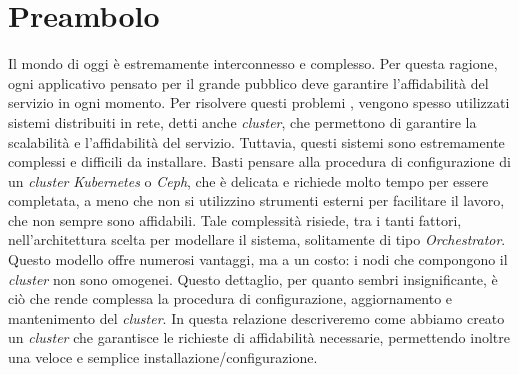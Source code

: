 
\section{Preambolo}
Il mondo di oggi è estremamente interconnesso e complesso. Per questa ragione, ogni applicativo pensato per il grande pubblico deve garantire l'affidabilità del servizio in ogni momento. Per risolvere questi problemi %
, vengono spesso utilizzati sistemi distribuiti in rete, detti anche \textit{cluster}, che permettono di garantire la scalabilità e l'affidabilità del servizio. Tuttavia, questi sistemi sono estremamente complessi e difficili 
da installare. Basti pensare alla procedura di configurazione di un \textit{cluster} \textit{Kubernetes} o \textit{Ceph}, che è delicata e richiede molto tempo per essere completata, a meno che non si utilizzino strumenti esterni %
per facilitare il lavoro, che non sempre sono affidabili. Tale complessità risiede, tra i tanti fattori, nell'architettura scelta per modellare il sistema, solitamente di tipo \textit{Orchestrator}. Questo modello offre numerosi 
vantaggi, ma a un costo: i nodi che compongono il \textit{cluster} non sono omogenei. %
Questo dettaglio, per quanto sembri insignificante, è ciò che rende complessa la procedura di configurazione, aggiornamento e mantenimento del \textit{cluster}. In questa relazione descriveremo come abbiamo creato un 
\textit{cluster} che garantisce le richieste di affidabilità necessarie, permettendo inoltre una veloce e semplice installazione/configurazione.
